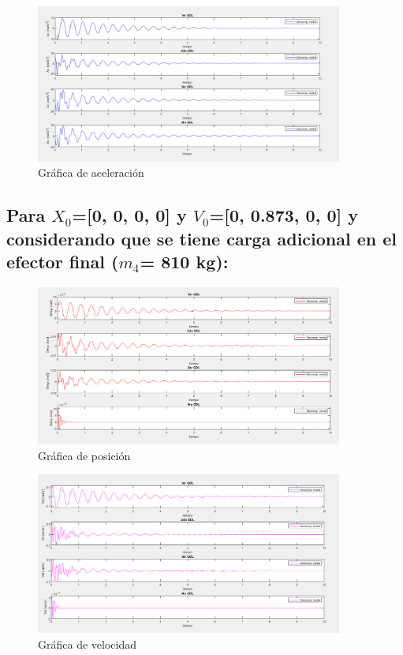 \documentclass{aleph-revista}
\begin{document}
\begin{figure}[H]
    \centering
    \includegraphics[width=0.90\textwidth]{Imagenes/r18.png}
    \caption{Gráfica de aceleración}
    \label{fig:etiqueta de la figura}
\end{figure}


\subsection{Para $X_0$=[0, 0, 0, 0] y $V_0$=[0, 0.873, 0, 0] y considerando que se tiene carga adicional en el efector final ($m_4$= 810 kg):}
\begin{figure}[H]
    \centering
    \includegraphics[width=0.90\textwidth]{Imagenes/r19.png}
    \caption{Gráfica de posición}
    \label{fig:etiqueta de la figura}
\end{figure}

\begin{figure}[H]
    \centering
    \includegraphics[width=0.90\textwidth]{Imagenes/r20.png}
    \caption{Gráfica de velocidad}
    \label{fig:etiqueta de la figura}
\end{figure}
\end{document}
